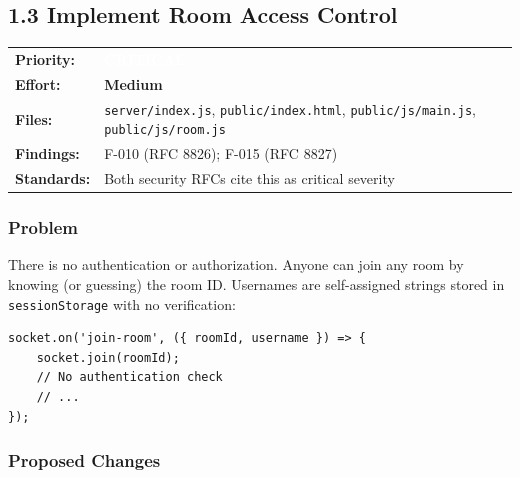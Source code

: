 \documentclass[11pt,letterpaper]{article}
\newcommand{\pricritical}{\colorbox{critical}{\textcolor{white}{\small\textbf{CRITICAL}}}}
\newcommand{\effmedium}{\colorbox{partial!30}{\small\textbf{Medium}}}
\begin{document}
\newpage

\subsection{1.3 Implement Room Access Control}

\begin{tabular}{ll}
\textbf{Priority:} & \pricritical \\
\textbf{Effort:} & \effmedium \\
\textbf{Files:} & \texttt{server/index.js}, \texttt{public/index.html}, \texttt{public/js/main.js}, \texttt{public/js/room.js} \\
\textbf{Findings:} & F-010 (RFC 8826); F-015 (RFC 8827) \\
\textbf{Standards:} & Both security RFCs cite this as critical severity \\
\end{tabular}

\subsubsection{Problem}

There is no authentication or authorization. Anyone can join any room by knowing (or guessing) the room ID. Usernames are self-assigned strings stored in \texttt{sessionStorage} with no verification:

\begin{verbatim}
socket.on('join-room', ({ roomId, username }) => {
    socket.join(roomId);
    // No authentication check
    // ...
});
\end{verbatim}

\subsubsection{Proposed Changes}
\end{document}
